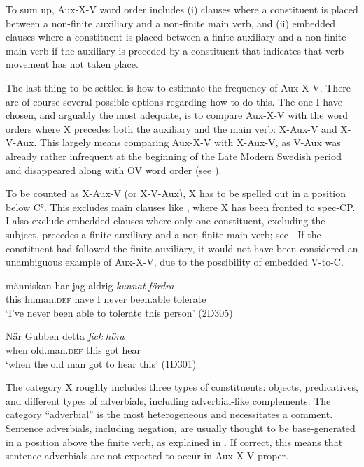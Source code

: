 \documentclass[output=paper, colorlinks, citecolor=brown]{langscibook}
\begin{document}
To sum up, Aux-X-V word order includes (i) clauses where a constituent is placed between a non-finite auxiliary and a non-finite main verb, and (ii) embedded clauses where a constituent is placed between a finite auxiliary and a non-finite main verb if the auxiliary is preceded by a constituent that indicates that verb movement has not taken place.


The last thing to be settled is how to estimate the frequency of Aux-X-V. There are of course several possible options regarding how to do this. The one I have chosen, and arguably the most adequate, is to compare Aux-X-V with the word orders where X precedes both the auxiliary and the main verb: X-Aux-V and X-V-Aux. This largely means comparing Aux-X-V with X-Aux-V, as V-Aux was already rather infrequent at the beginning of the Late Modern Swedish period and disappeared along with OV word order (see \citealt{Platzack1983,Petzell2011,Sangfelt2019}).



To be counted as X-Aux-V (or X-V-Aux), X has to be spelled out in a position below C°. This excludes main clauses like , where X has been fronted to spec-CP. I also exclude embedded clauses where only one constituent, excluding the subject, precedes a finite auxiliary and a non-finite main verb; see . If the constituent had followed the finite auxiliary, it would not have been considered an unambiguous example of Aux-X-V, due to the possibility of embedded V-to-C.


\ea
\label{ex:sangfelt:25} %
\ea\label{ex:sangfelt:25a} 
 {människan} har jag aldrig \textit{kunnat} \textit{fördra} \\
 this human.\textsc{def} have I never been.able tolerate\\
\glt ‘I’ve never been able to tolerate this person’ (2D305)

\ex\label{ex:sangfelt:25b} 
\gll När Gubben {detta} \textit{fick} \textit{höra} \\
 when old.man.\textsc{def} this got hear\\
\glt ‘when the old man got to hear this’ (1D301)
\z
\z

\begin{sloppypar}
The category X roughly includes three types of constituents: objects, predicatives, and different types of adverbials, including adverbial-like complements. The category “adverbial” is the most heterogeneous and necessitates a comment. Sentence adverbials, including negation, are usually thought to be base-generated in a position above the finite verb, as explained in . If correct, this means that sentence adverbials are not expected to occur in Aux-X-V proper.
\end{sloppypar}
\end{document}
